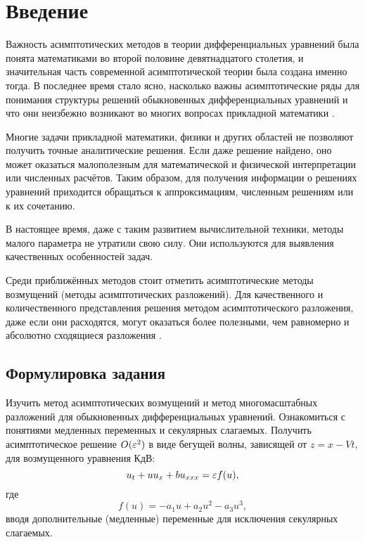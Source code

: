 \chapter*{Введение}

Важность асимптотических методов
в теории дифференциальных уравнений
была понята математиками
во второй половине девятнадцатого столетия,
и значительная часть современной асимптотической теории
была создана именно тогда.
В последнее время стало ясно,
насколько важны асимптотические ряды
для понимания структуры решений обыкновенных дифференциальных уравнений
и что они неизбежно возникают во многих вопросах прикладной математики
\cite{vazov1968}.

Многие задачи прикладной математики, физики и других областей
не позволяют получить точные аналитические решения.
Если даже решение найдено,
оно может оказаться малополезным для
математической и физической интерпретации
или численных расчётов.
Таким образом, для получения информации
о решениях уравнений приходится
обращаться к аппроксимациям,
численным решениям или к их сочетанию.

В настоящее время, даже с таким развитием
вычислительной техники,
методы малого параметра не утратили свою силу.
Они используются для выявления качественных особенностей задач.

Среди приближённых методов
стоит отметить асимптотические методы возмущений
(методы асимптотических разложений).
Для качественного и количественного представления
решения методом асимптотического разложения,
даже если они расходятся,
могут оказаться более полезными,
чем равномерно и абсолютно сходящиеся разложения
\cite{nayfeh1977}.

\section*{Формулировка задания}

Изучить метод асимптотических возмущений
и метод многомасштабных разложений
для обыкновенных дифференциальных уравнений.
Ознакомиться с понятиями медленных переменных
и секулярных слагаемых.
Получить асимптотическое решение  $O(\varepsilon^2)$
в виде бегущей волны, зависящей от $z=x-Vt$,
для возмущенного уравнения КдВ:
\begin{equation*}
    u_t + u u_x + b u_{xxx} = \varepsilon f(u),
\end{equation*}
где
\begin{equation*}
    f(u) = - a_1 u + a_2 u^2 - a_3 u^3,
\end{equation*}
вводя дополнительные (медленные) переменные
для исключения секулярных слагаемых.

